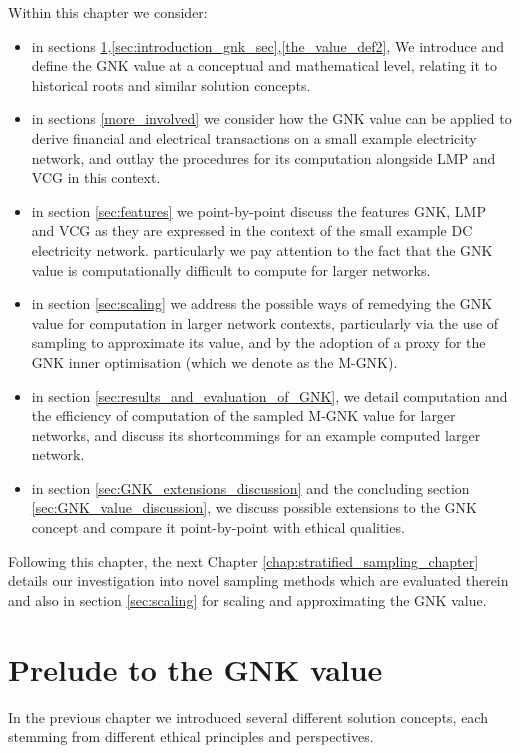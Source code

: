 Within this chapter we consider:
\begin{itemize}
\item	in sections \ref{sec:prelude_gnk},\ref{sec:introduction_gnk_sec},\ref{the_value_def2}, We introduce and define the GNK value at a conceptual and mathematical level, relating it to historical roots and similar solution concepts.
\item	in sections \ref{more_involved} we consider how the GNK value can be applied to derive financial and electrical transactions on a small example electricity network, and outlay the procedures for its computation alongside LMP and VCG in this context.
\item	in section \ref{sec:features} we point-by-point discuss the features GNK, LMP and VCG as they are expressed in the context of the small example DC electricity network. particularly we pay attention to the fact that the GNK value is computationally difficult to compute for larger networks.
\item	in section \ref{sec:scaling} we address the possible ways of remedying the GNK value for computation in larger network contexts, particularly via the use of sampling to approximate its value, and by the adoption of a proxy for the GNK inner optimisation (which we denote as the M-GNK).
\item	in section \ref{sec:results_and_evaluation_of_GNK}, we detail computation and the efficiency of computation of the sampled M-GNK value for larger networks, and discuss its shortcommings for an example computed larger network.
\item	in section \ref{sec:GNK_extensions_discussion} and the concluding section \ref{sec:GNK_value_discussion}, we discuss possible extensions to the GNK concept and compare it point-by-point with ethical qualities.
\end{itemize}

Following this chapter, the next Chapter \ref{chap:stratified_sampling_chapter} details our investigation into novel sampling methods which are evaluated therein and also in section \ref{sec:scaling} for scaling and approximating the GNK value.

\section{Prelude to the GNK value}\label{sec:prelude_gnk}

In the previous chapter we introduced several different solution concepts, each stemming from different ethical principles and perspectives.

